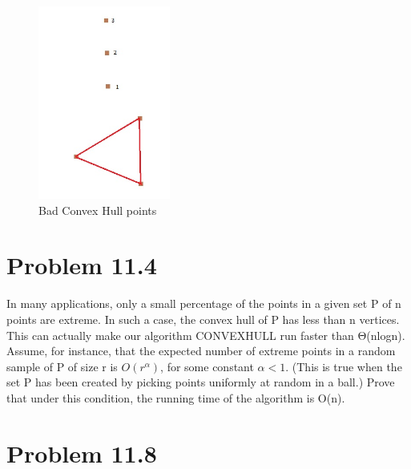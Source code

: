 \documentclass[11pt,psfig]{article}
\begin{document}
\begin{figure}[H]
\centering
\includegraphics[height=2.5in]{hw8prob1diagram.jpg}
\caption{Bad Convex Hull points}
\end{figure}

\newpage

\section*{Problem 11.4}

In many applications, only a small percentage of the points in a given set
P of n points are extreme. In such a case, the convex hull of P has less
than n vertices. This can actually make our algorithm CONVEXHULL
run faster than Θ(nlogn).\\

Assume, for instance, that the expected number of extreme points in a
random sample of P of size r is $O(r^\alpha)$, for some constant $\alpha < 1$. (This
is true when the set P has been created by picking points uniformly at
random in a ball.) Prove that under this condition, the running time of
the algorithm is O(n).

\newpage

\section*{Problem 11.8}
\end{document}

